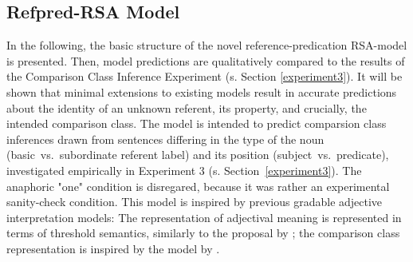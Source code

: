 \subsection{Refpred-RSA Model}
\label{refpred-rsa}
In the following, the basic structure of the novel reference-predication RSA-model is presented. %
Then, model predictions are qualitatively compared to the results of the Comparison Class Inference Experiment (s. Section \ref{experiment3}). It will be shown that minimal extensions to existing models result in accurate predictions about the identity of an unknown referent, its property, and crucially, the intended comparison class. 
The model is intended to predict comparsion class inferences drawn from sentences differing in the type of the noun (basic~vs.~subordinate referent label) and its position (subject~vs.~predicate), investigated empirically in Experiment 3 (s. Section~\ref{experiment3}). The anaphoric "one" condition is disregared, because it was rather an experimental sanity-check condition. This model is inspired by previous gradable adjective interpretation models: The representation of adjectival meaning is represented in terms of threshold semantics, similarly to the proposal by \textcite{lassiter2013context}; the comparison class representation is inspired by the model by \textcite{tessler2017warm}.


